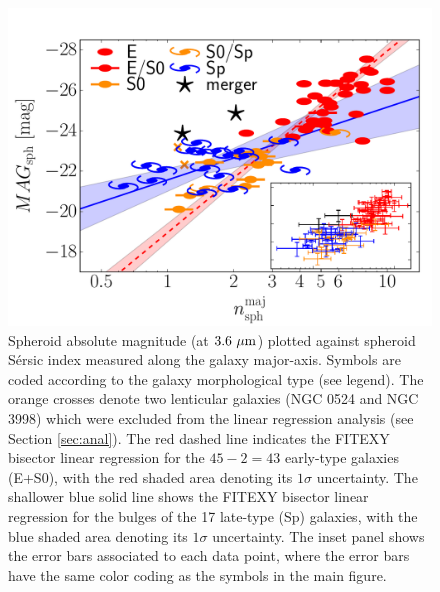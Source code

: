 \documentclass[preprint2]{emulateapj}
\begin{document}
\begin{figure}[h]
\begin{center}
\includegraphics[width=\columnwidth]{images/mag_vs_n_maj.pdf}
\caption{Spheroid absolute magnitude (at $3.6\rm~\mu m$) plotted against spheroid S\'ersic index 
measured along the galaxy major-axis. 
Symbols are coded according to the galaxy morphological type (see legend).
The orange crosses denote two lenticular galaxies (NGC 0524 and NGC 3998) which were excluded from the linear regression analysis 
(see Section \ref{sec:anal}). 
The red dashed line indicates the FITEXY bisector linear regression for the $45-2=43$  early-type galaxies (E+S0), 
with the red shaded area denoting its $1\sigma$ uncertainty. 
The shallower blue solid line shows the FITEXY bisector linear regression for the bulges of the 17 late-type (Sp) galaxies, 
with the blue shaded area denoting its $1\sigma$ uncertainty. 
The inset panel shows the error bars associated to each data point,  
where the error bars have the same color coding as the symbols in the main figure. 
}
\label{fig:magn}
\end{center}
\end{figure}
\end{document}
